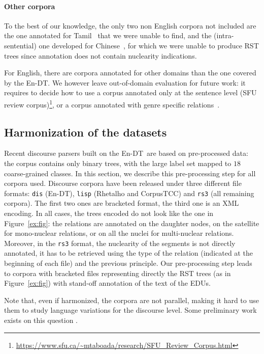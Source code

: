 \documentclass[11pt]{article}
\newcommand{\erstdt}{En-DT}
\begin{document}
\paragraph{Other corpora} 
To the best of our knowledge, the only two non English corpora not included are the one annotated for Tamil~\cite{subalalitha:approach:2012} that we were unable to find, and the (intra-sentential) one developed for Chinese~\cite{wu:new:2016}, for which we were unable to produce RST trees since annotation does not contain nuclearity indications.

For English, there are corpora annotated for other domains than the one covered by the \erstdt.
We however leave out-of-domain evaluation for future work: it requires to decide how to use a corpus annotated only at the sentence level (SFU review corpus)\footnote{\url{https://www.sfu.ca/~mtaboada/research/SFU_Review_Corpus.html}}, or a corpus annotated with genre specific relations~\cite{subba:effective:2009}.


\subsection{Harmonization of the datasets}
\label{subsec:harmonization}

Recent discourse parsers built on the \erstdt\ are based on pre-processed data: the corpus contains only binary trees, with the large label set mapped to $18$ coarse-grained classes. 
In this section, we describe this pre-processing step for all corpora used. 
Discourse corpora have been released under three different file formats: \texttt{dis} (\erstdt), \texttt{lisp} (Rhetalho and CorpusTCC) and \texttt{rs3} (all remaining corpora). The first two ones are bracketed format, the third one is an XML encoding. 
In all cases, the trees encoded do not look like the one in Figure~\ref{ex:fig}: the relations are annotated on the daughter nodes, on the satellite for mono-nuclear relations, or on all the nuclei for multi-nuclear relations. Moreover, in the \texttt{rs3} format, the nuclearity of the segments is not directly annotated, it has to be retrieved using the type of the relation (indicated at the beginning of each file) and the previous principle.
Our pre-processing step leads to corpora with bracketed files representing directly the RST trees (as in Figure~\ref{ex:fig}) with stand-off annotation of the text of the EDUs.

Note that, even if harmonized, the corpora are not parallel, making it hard to use them to study language variations for the discourse level.
Some preliminary work exists on this question \cite{iruskieta:qualitative:2015}.
\end{document}

